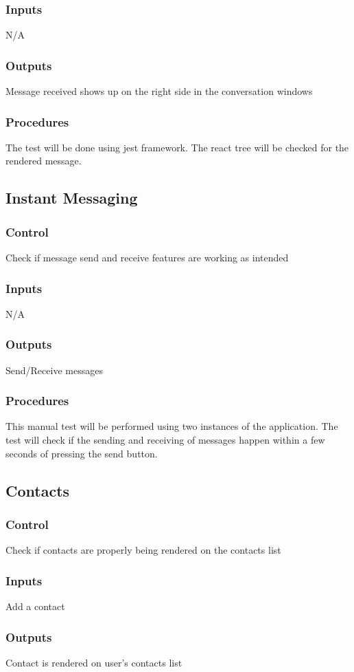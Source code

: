 \documentclass[12pt, titlepage]{article}
\begin{document}
\subsubsection{Inputs}
N/A
\subsubsection{Outputs}
Message received shows up on the right side in the conversation windows
\subsubsection{Procedures}
The test will be done using jest framework. The react tree will be checked for the rendered message.
\subsection{Instant Messaging}
\subsubsection{Control}
Check if message send and receive features are working as  intended
\subsubsection{Inputs}
N/A
\subsubsection{Outputs}
Send/Receive messages
\subsubsection{Procedures}
This manual test will be performed using two instances of the application. The test will check if the sending and receiving of messages happen within a few seconds of pressing the send button.
\subsection{Contacts}
\subsubsection{Control}
Check if contacts are properly being rendered on the contacts list
\subsubsection{Inputs}
Add a contact
\subsubsection{Outputs}
Contact is rendered on user's contacts list
\end{document}
